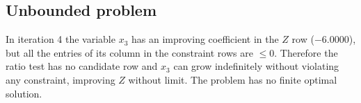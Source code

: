 \subsection*{Unbounded problem}
In iteration 4 the variable $x_{3}$ has an improving coefficient in the $Z$ row ($-6.0000$), but all the entries of its column in the constraint rows are $\le 0$. Therefore the ratio test has no candidate row and $x_{3}$ can grow indefinitely without violating any constraint, improving $Z$ without limit. The problem has no finite optimal solution.
